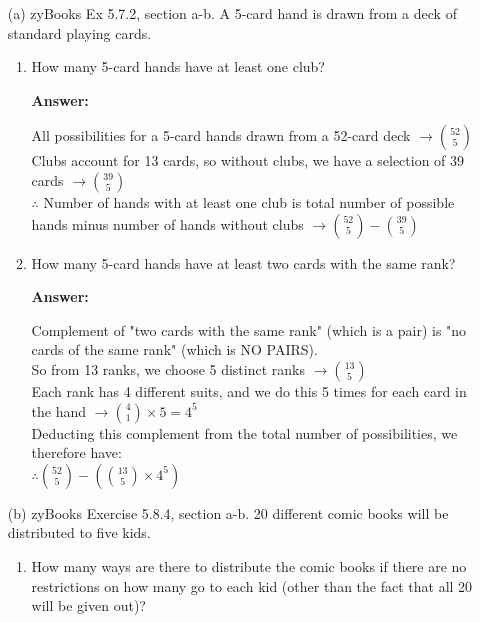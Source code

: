 \documentclass[14pt]{extreport}
\newcommand{\answer}[0]{\medskip \textbf{Answer:} \medskip}
\begin{document}
\begin{enumerate}[label=(\alph*)]
    \item[(a)] zyBooks Ex 5.7.2, section a-b. A 5-card hand is drawn from a deck of standard playing cards.
    
        \begin{enumerate}
            \item How many 5-card hands have at least one club?
            
                \answer

                All possibilities for a 5-card hands drawn from a 52-card deck $\rightarrow \binom{52}{5}$\\
                Clubs account for 13 cards, so without clubs, we have a selection of 39 cards $\rightarrow \binom{39}{5}$\\
                $\therefore$ Number of hands with at least one club is total number of possible hands minus number of hands without clubs $\rightarrow \binom{52}{5} - \binom{39}{5}$\\
                
            \item How many 5-card hands have at least two cards with the same rank? 
            
                \answer

                Complement of "two cards with the same rank" (which is a pair) is "no cards of the same rank" (which is NO PAIRS).\\
                So from 13 ranks, we choose 5 distinct ranks $\rightarrow \binom{13}{5}$\\
                Each rank has 4 different suits, and we do this 5 times for each card in the hand $\rightarrow \binom{4}{1} \times 5 = 4^{5}$\\
                Deducting this complement from the total number of possibilities, we therefore have:\\
                $\therefore \binom{52}{5} - \left( \binom{13}{5} \times 4^{5} \right)$\\
            
        \end{enumerate}
    
    \item[(b)] zyBooks Exercise 5.8.4, section a-b. 20 different comic books will be distributed to five kids.
    
        \begin{enumerate}
            \item How many ways are there to distribute the comic books if there are no restrictions on how many go to each kid (other than the fact that all 20 will be given out)? 
                

\end{enumerate}
\end{enumerate}
\end{document}
